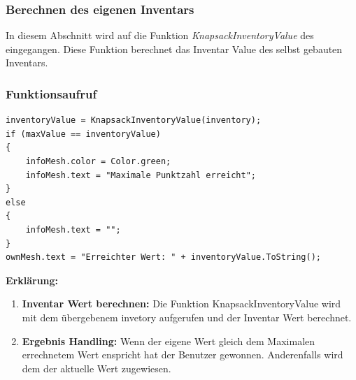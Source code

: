 \subsubsection{Berechnen des eigenen Inventars}
In diesem Abschnitt wird auf die Funktion \textit{KnapsackInventoryValue} des  eingegangen. Diese Funktion
berechnet das Inventar Value des selbst gebauten Inventars.

\subsubsection{Funktionsaufruf}
\begin{lstlisting}[style=csharp, caption={}, label=code:aufruf]
inventoryValue = KnapsackInventoryValue(inventory);
if (maxValue == inventoryValue)
{
    infoMesh.color = Color.green;
    infoMesh.text = "Maximale Punktzahl erreicht";
}
else
{
    infoMesh.text = "";
}
ownMesh.text = "Erreichter Wert: " + inventoryValue.ToString();
\end{lstlisting}
\textbf{Erklärung:}
\begin{enumerate}
    \item \textbf{Inventar Wert berechnen:} Die Funktion KnapsackInventoryValue wird mit dem übergebenem invetory aufgerufen und der Inventar Wert berechnet.
    \item \textbf{Ergebnis Handling:} Wenn der eigene Wert gleich dem Maximalen errechnetem Wert enspricht hat der Benutzer gewonnen. Anderenfalls wird dem  der aktuelle Wert zugewiesen.
\end{enumerate}

